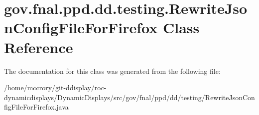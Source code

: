 \hypertarget{classgov_1_1fnal_1_1ppd_1_1dd_1_1testing_1_1RewriteJsonConfigFileForFirefox}{\section{gov.\-fnal.\-ppd.\-dd.\-testing.\-Rewrite\-Json\-Config\-File\-For\-Firefox Class Reference}
\label{classgov_1_1fnal_1_1ppd_1_1dd_1_1testing_1_1RewriteJsonConfigFileForFirefox}
}


The documentation for this class was generated from the following file\-:\begin{DoxyCompactItemize}
\item 
/home/mccrory/git-\/ddisplay/roc-\/dynamicdisplays/\-Dynamic\-Displays/src/gov/fnal/ppd/dd/testing/Rewrite\-Json\-Config\-File\-For\-Firefox.\-java\end{DoxyCompactItemize}
